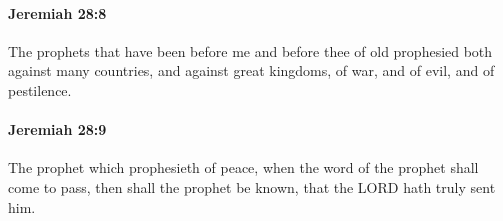 		\paragraph{Jeremiah 28:8} %
			\label{JEREMIAH-28-8}

			The prophets that have been before me and before thee of old prophesied both against many countries, and against great kingdoms, of war, and of evil, and of pestilence.


		\paragraph{Jeremiah 28:9} %
			\label{JEREMIAH-28-9}

			The prophet which prophesieth of peace, when the word of the prophet shall come to pass, then shall the prophet be known, that the LORD hath truly sent him.


